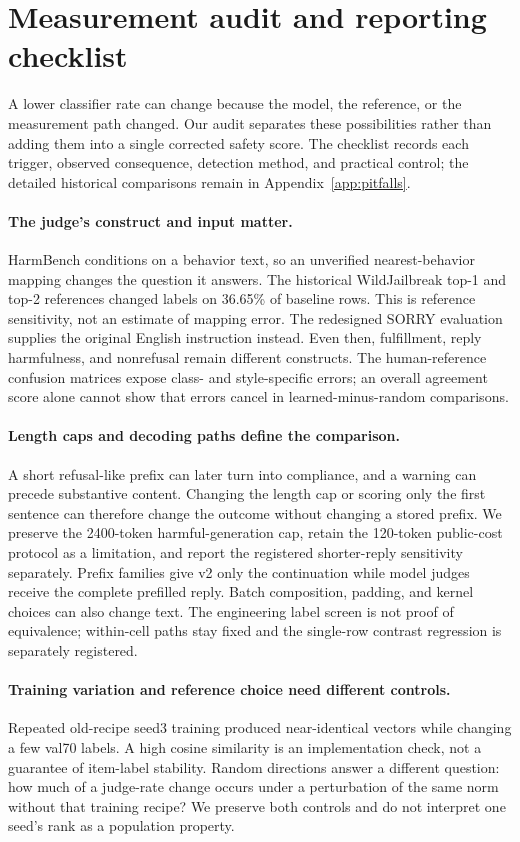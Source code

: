 \section{Measurement audit and reporting checklist}
\label{sec:pitfalls}
A lower classifier rate can change because the model, the reference, or the measurement path changed. Our audit separates these possibilities rather than adding them into a single corrected safety score. The checklist records each trigger, observed consequence, detection method, and practical control; the detailed historical comparisons remain in Appendix~\ref{app:pitfalls}.

\paragraph{The judge's construct and input matter.} HarmBench conditions on a behavior text, so an unverified nearest-behavior mapping changes the question it answers. The historical WildJailbreak top-1 and top-2 references changed labels on 36.65\% of baseline rows. This is reference sensitivity, not an estimate of mapping error. The redesigned SORRY evaluation supplies the original English instruction instead. Even then, fulfillment, reply harmfulness, and nonrefusal remain different constructs. The human-reference confusion matrices expose class- and style-specific errors; an overall agreement score alone cannot show that errors cancel in learned-minus-random comparisons.

\paragraph{Length caps and decoding paths define the comparison.} A short refusal-like prefix can later turn into compliance, and a warning can precede substantive content. Changing the length cap or scoring only the first sentence can therefore change the outcome without changing a stored prefix. We preserve the 2400-token harmful-generation cap, retain the 120-token public-cost protocol as a limitation, and report the registered shorter-reply sensitivity separately. Prefix families give v2 only the continuation while model judges receive the complete prefilled reply. Batch composition, padding, and kernel choices can also change text. The engineering label screen is not proof of equivalence; within-cell paths stay fixed and the single-row contrast regression is separately registered.

\paragraph{Training variation and reference choice need different controls.} Repeated old-recipe seed3 training produced near-identical vectors while changing a few val70 labels. A high cosine similarity is an implementation check, not a guarantee of item-label stability. Random directions answer a different question: how much of a judge-rate change occurs under a perturbation of the same norm without that training recipe? We preserve both controls and do not interpret one seed's rank as a population property.

